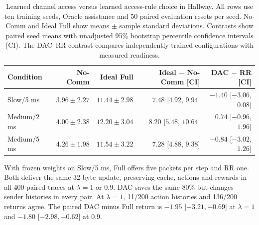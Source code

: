 \documentclass[pdflatex,sn-mathphys-num]{sn-jnl}
\begin{document}
\begin{table}[htbp]\centering\normalsize
\caption{Learned channel access versus learned access-rule choice in Hallway. All rows use ten training seeds, Oracle assistance and 50 paired evaluation resets per seed. No-Comm and Ideal Full show means $\pm$ sample standard deviations. Contrasts show paired seed means with unadjusted 95\% bootstrap percentile confidence intervals (CI). The DAC--RR contrast compares independently trained configurations with measured readiness.}\label{tab:learning_selection}
{\footnotesize\setlength{\tabcolsep}{1.3pt}\begin{tabular}{lrrrr}\toprule
Condition & No-Comm & Ideal Full & Ideal $-$ No-Comm [CI] & DAC $-$ RR [CI]\\\midrule
Slow/5 ms & $3.96\pm2.27$ & $11.44\pm2.98$ & $7.48$ [$4.92$, $9.94$] & $-1.40$ [$-3.06$, $0.08$]\\
Medium/2 ms & $4.00\pm2.38$ & $12.20\pm3.04$ & $8.20$ [$5.48$, $10.64$] & $0.74$ [$-0.96$, $1.96$]\\
Medium/5 ms & $4.26\pm1.98$ & $11.54\pm3.22$ & $7.28$ [$4.88$, $9.38$] & $-0.84$ [$-3.02$, $1.26$]\\
\bottomrule\end{tabular}}
\end{table}

With frozen weights on Slow/5 ms, Full offers five packets per step and RR one. Both deliver the same 32-byte update, preserving cache, actions and rewards in all 400 paired traces at $\lambda=1$ or 0.9. DAC saves the same 80\% but changes sender histories in every pair. At $\lambda=1$, 11/200 action histories and 136/200 returns agree. The paired DAC minus Full return is $-1.95$ [$-3.21,-0.69$] at $\lambda=1$ and $-1.80$ [$-2.98,-0.62$] at 0.9.
\end{document}
